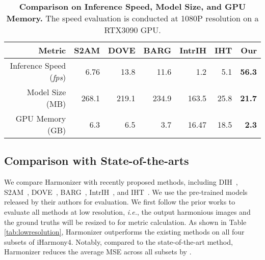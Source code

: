 \documentclass[runningheads]{llncs}
\begin{document}
\begin{table*}[t]
  \begin{center}
    \caption{\textbf{Comparison on Inference Speed, Model Size, and GPU Memory.} The speed evaluation is conducted at 1080P resolution on a RTX3090 GPU.}\label{tab:other}
\setlength{\tabcolsep}{5pt}
\scriptsize
\begin{tabular}{r|rrrrr|r}
\toprule
Metric & S2AM\cite{S2AM} & DOVE\cite{DoveNet} & BARG\cite{BargainNet} & IntrIH\cite{IntrinsicIH} & IHT\cite{TransformerIH} &\;\;\;\; Our \\
\midrule
Inference Speed ({\it fps})      & 6.76  & 13.8 & 11.6 & 1.2 & 5.1 & \textbf{56.3} \\
Model Size (MB)               &  268.1  & 219.1 & 234.9 & 163.5 & 25.8 & \textbf{21.7} \\
GPU Memory (GB)              & 6.3 & 6.5 & 3.7 & 16.47 & 18.5 & \textbf{2.3} \\
\bottomrule
\end{tabular}
\vspace{-0.5cm}
\end{center}
\end{table*}

\subsection{Comparison with State-of-the-arts}\label{sec:4_1}
We compare Harmonizer with recently proposed methods, including DIH~\cite{DIH}, S2AM~\cite{S2AM}, DOVE~\cite{DoveNet}, BARG~\cite{BargainNet}, IntrIH~\cite{IntrinsicIH}, and IHT~\cite{TransformerIH}. We use the pre-trained models released by their authors for evaluation. We first follow the prior works to evaluate all methods at low resolution, {\it i.e.}, the output harmonious images and the ground truths will be resized to  for metric calculation. As shown in Table\,\ref{tab:lowresolution}, Harmonizer outperforms the existing methods on all four subsets of iHarmony4. Notably, compared to the state-of-the-art method, Harmonizer reduces the average MSE across all subsets by .
\end{document}
